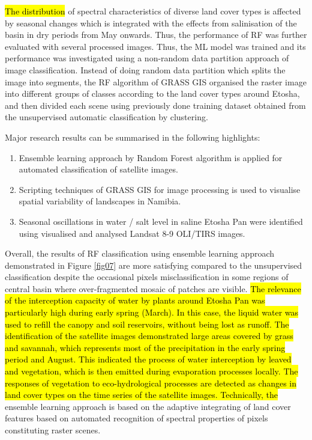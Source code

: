 \documentclass[climate,article,submit,pdftex,moreauthors]{Definitions/mdpi}
\begin{document}
\hl{The distribution} of spectral characteristics of diverse land cover types is affected by seasonal changes which is integrated with the effects from salinisation of the basin in dry periods from May onwards.\hl{ }Thus, the performance of RF was further evaluated with several processed images. Thus, the ML model was trained and its performance was investigated using a non-random data partition approach of image classification. Instead of doing random data partition which splits the image into segments, the RF algorithm of GRASS GIS organised the raster image into different groups of classes according to the land cover types around Etosha, and then divided each scene using previously done training dataset obtained from the unsupervised automatic classification by clustering.

Major research results can be summarised in the following highlights: 
\begin{enumerate}
\item Ensemble learning approach by Random Forest algorithm is applied for automated classification of satellite images. 
\item Scripting techniques of GRASS GIS for image processing is used to visualise spatial variability of landscapes in Namibia.
\item Seasonal oscillations in water / salt level in saline Etosha Pan were identified using visualised and analysed Landsat 8-9 OLI/TIRS images.
\end{enumerate}

Overall, the results of RF classification using ensemble learning approach demonstrated in Figure \ref{fig07} are more satisfying compared to the unsupervised classification despite the occasional pixels misclassification in some regions of central basin where over-fragmented mosaic of patches are visible. \hl{The relevance of the interception capacity of water by plants around Etosha Pan was particularly high during early spring (March). In this case, the liquid water was used to refill the canopy and soil reservoirs, without being lost as runoff. The identification of the satellite images demonstrated large areas covered by grass and savannah, which represents most of the precipitation in the early spring period and August. This indicated the process of water interception by leaved and vegetation, which is then emitted during evaporation processes locally. The responses of vegetation to eco-hydrological processes are detected as changes in land cover types on the time series of the satellite images. Technically, the} ensemble learning approach is based on the adaptive integrating of land cover features based on automated recognition of spectral properties of pixels constituting raster scenes. 
\end{document}
